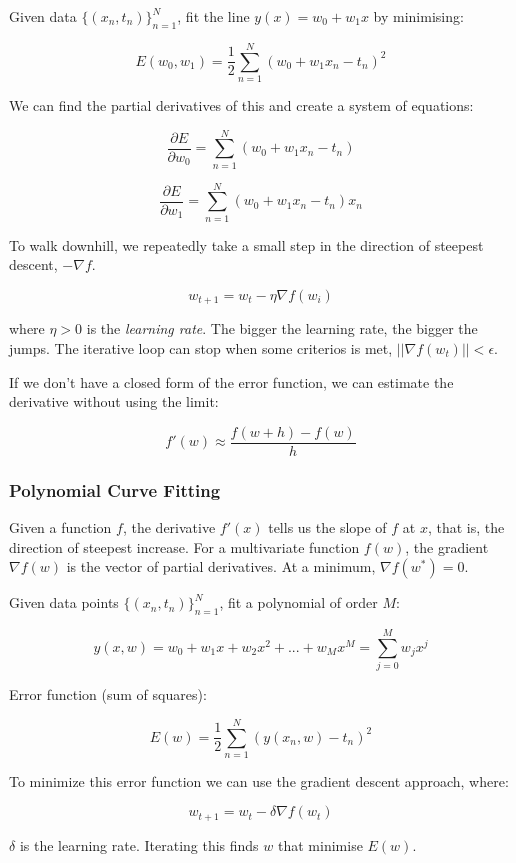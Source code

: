 \documentclass{article}
\begin{document}
Given data \(\{(x_n, t_n)\}_{n=1}^N\), fit the line
\(y(x) = w_0 + w_1 x\) by minimising:

\[E(w_0, w_1) = \frac{1}{2} \sum_{n=1}^N (w_0 + w_1 x_n - t_n)^2\]

We can find the partial derivatives of this and create a system of
equations:

\[\frac{\partial E}{\partial w_0} = \sum_{n=1}^N (w_0 + w_1 x_n - t_n)\]

\[\frac{\partial E}{\partial w_1} = \sum_{n=1}^N (w_0 + w_1 x_n - t_n)x_n\]

To walk downhill, we repeatedly take a small step in the direction of
steepest descent, \(- \nabla f\).

\[w_{t+1} = w_t - \eta \nabla f(w_i)\]

where \(\eta > 0\) is the \emph{learning rate}. The bigger the learning
rate, the bigger the jumps. The iterative loop can stop when some
criterios is met, \(||\nabla f(w_t)|| < \epsilon\).

If we don't have a closed form of the error function, we can estimate
the derivative without using the limit:

\[f'(w) \approx \frac{f(w+h) - f(w)}{h}\]

\subsubsection{Polynomial Curve Fitting}\label{polynomial-curve-fitting}

Given a function \(f\), the derivative \(f'(x)\) tells us the slope of
\(f\) at \(x\), that is, the direction of steepest increase. For a
multivariate function \(f(w)\), the gradient \(\nabla f(w)\) is the
vector of partial derivatives. At a minimum, \(\nabla f(w^*)=0\).

Given data points \(\{(x_n, t_n)\}_{n=1}^N\), fit a polynomial of order
\(M\):

\[y(x, w) = w_0 + w_1 x + w_2 x^2 + ... + w_M x^M = \sum_{j=0}^M w_j x^j\]

Error function (sum of squares):

\[E(w) = \frac{1}{2}\sum_{n=1}^N (y(x_n, w) - t_n)^2\]

To minimize this error function we can use the gradient descent
approach, where:

\[w_{t+1} = w_t - \delta \nabla f(w_t)\]

\(\delta\) is the learning rate. Iterating this finds \(w\) that
minimise \(E(w)\).
\end{document}
